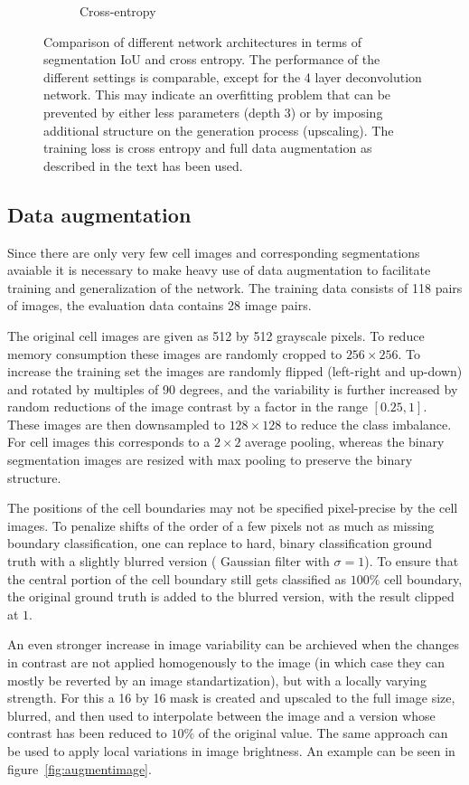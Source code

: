 \documentclass[aps,prl,twocolumn,groupedaddress,amsmath,amssymb]{revtex4-1}
\begin{document}
\begin{figure}[tbp]
\begin{subfigure}[c]{\linewidth}
            \caption{Cross-entropy}
        \end{subfigure}
        \caption{Comparison of different network architectures in terms of segmentation IoU and
        cross entropy. The performance of the different settings is comparable, except for the 
        4 layer deconvolution network. This may indicate an overfitting problem that can be
        prevented by either less parameters (depth 3) or by imposing additional structure on the 
        generation process (upscaling). The training loss is cross entropy and full data
        augmentation as described in the text has been used.}
        \label{fig:arch}
    \end{figure}

    \subsection{Data augmentation}
    Since there are only very few cell images and corresponding segmentations avaiable it is 
    necessary to make heavy use of data augmentation to facilitate training and generalization 
    of the network. The training data consists of 118 pairs of images, the evaluation data contains
    28 image pairs.

    The original cell images are given as 512 by 512 grayscale pixels. To reduce memory consumption
    these images are randomly cropped to $256\times256$. To increase the training set the images are
    randomly flipped (left-right and up-down) and rotated by multiples of 90 degrees, and the
    variability is further increased by random reductions of the image contrast by a factor in the
    range $[0.25, 1]$. These images are then downsampled to $128\times128$ to reduce the class
    imbalance. For cell images this corresponds to a $2\times2$ average pooling, whereas the binary
    segmentation images are resized with max pooling to preserve the binary structure.

    The positions of the cell boundaries may not be specified pixel-precise by the cell images. To 
    penalize shifts of the order of a few pixels not as much as missing boundary classification, one 
    can replace to hard, binary classification ground truth with a slightly blurred version (
    Gaussian filter with $\sigma=1$). To ensure that the central portion of the cell boundary still
    gets classified as $100\%$ cell boundary, the original ground truth is added to the blurred 
    version, with the result clipped at $1$.

    An even stronger increase in image variability can be archieved when the changes in contrast are
    not applied homogenously to the image (in which case they can mostly be reverted by an  image
    standartization), but with a locally varying strength. For this a 16 by 16 mask is created and
    upscaled to the full image size, blurred, and then used to interpolate between the image and a
    version whose contrast has been reduced to $10\%$ of the original value. The same approach can
    be used to apply local variations in image brightness. An example can be seen in
    figure~\ref{fig:augmentimage}.
\end{document}
